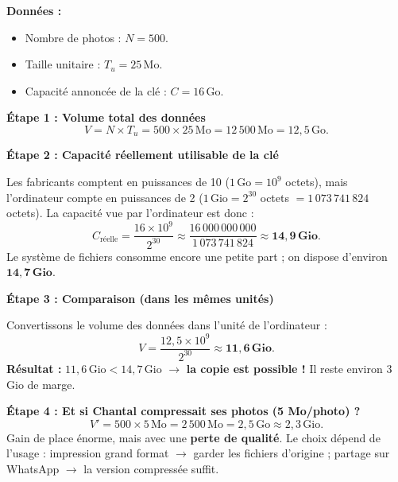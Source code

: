 \documentclass[11pt]{article}
\begin{document}
\begin{exemplebox}
\textbf{Données :}
\begin{itemize}
    \item Nombre de photos : $N = 500$.
    \item Taille unitaire : $T_u = 25\,\text{Mo}$.
    \item Capacité annoncée de la clé : $C = 16\,\text{Go}$.
\end{itemize}

\textbf{Étape 1 : Volume total des données}
\[
V = N \times T_u = 500 \times 25\,\text{Mo} = 12\,500\,\text{Mo} = 12{,}5\,\text{Go}.
\]

\textbf{Étape 2 : Capacité réellement utilisable de la clé}

Les fabricants comptent en puissances de 10 ($1\,\text{Go} = 10^9$ octets), mais l'ordinateur compte en puissances de 2 ($1\,\text{Gio} = 2^{30}$ octets $= 1\,073\,741\,824$ octets). La capacité vue par l'ordinateur est donc :
\[
C_{\text{réelle}} = \frac{16 \times 10^9}{2^{30}} \approx \frac{16\,000\,000\,000}{1\,073\,741\,824} \approx \mathbf{14{,}9\,\text{Gio}}.
\]
Le système de fichiers consomme encore une petite part ; on dispose d'environ $\mathbf{14{,}7\,\text{Gio}}$.

\textbf{Étape 3 : Comparaison (dans les mêmes unités)}

Convertissons le volume des données dans l'unité de l'ordinateur :
\[
V = \frac{12{,}5 \times 10^9}{2^{30}} \approx \mathbf{11{,}6\,\text{Gio}}.
\]
\textbf{Résultat :} $11{,}6\,\text{Gio} < 14{,}7\,\text{Gio}$ $\to$ \textbf{la copie est possible !} Il reste environ $3$ Gio de marge.

\textbf{Étape 4 : Et si Chantal compressait ses photos (5 Mo/photo) ?}
\[
V' = 500 \times 5\,\text{Mo} = 2\,500\,\text{Mo} = 2{,}5\,\text{Go} \approx 2{,}3\,\text{Gio}.
\]
Gain de place énorme, mais avec une \textbf{perte de qualité}. Le choix dépend de l'usage : impression grand format $\to$ garder les fichiers d'origine ; partage sur WhatsApp $\to$ la version compressée suffit.
\end{exemplebox}
\end{document}

